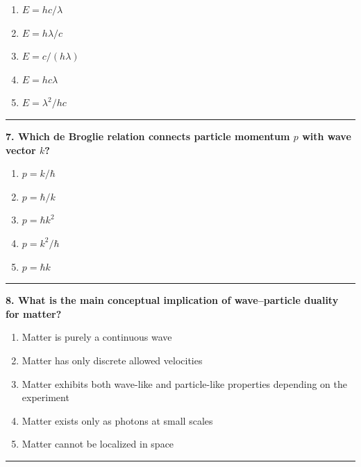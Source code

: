 \documentclass[
  english,
  9pt,
]{extbook}
\providecommand{\tightlist}{%
  \setlength{\itemsep}{0pt}\setlength{\parskip}{0pt}}
\theoremstyle{definition}
\theoremstyle{definition}
\theoremstyle{definition}
\theoremstyle{definition}
\theoremstyle{remark}
\begin{document}
\begin{enumerate}
\def\labelenumi{\alph{enumi}.}
\tightlist
\item
  \(E = h c / \lambda\)
\item
  \(E = h \lambda / c\)
\item
  \(E = c / (h \lambda)\)
\item
  \(E = h c \lambda\)
\item
  \(E = \lambda^2 / h c\)
\end{enumerate}

\begin{center}\rule{0.5\linewidth}{0.5pt}\end{center}

\textbf{7. Which de Broglie relation connects particle momentum \(p\) with wave vector \(k\)?}

\begin{enumerate}
\def\labelenumi{\alph{enumi}.}
\tightlist
\item
  \(p = k / \hbar\)
\item
  \(p = \hbar / k\)
\item
  \(p = \hbar k^2\)
\item
  \(p = k^2 / \hbar\)
\item
  \(p = \hbar k\)
\end{enumerate}

\begin{center}\rule{0.5\linewidth}{0.5pt}\end{center}

\textbf{8. What is the main conceptual implication of wave--particle duality for matter?}

\begin{enumerate}
\def\labelenumi{\alph{enumi}.}
\tightlist
\item
  Matter is purely a continuous wave\\
\item
  Matter has only discrete allowed velocities\\
\item
  Matter exhibits both wave-like and particle-like properties depending on the experiment\\
\item
  Matter exists only as photons at small scales\\
\item
  Matter cannot be localized in space
\end{enumerate}

\begin{center}\rule{0.5\linewidth}{0.5pt}\end{center}
\end{document}
